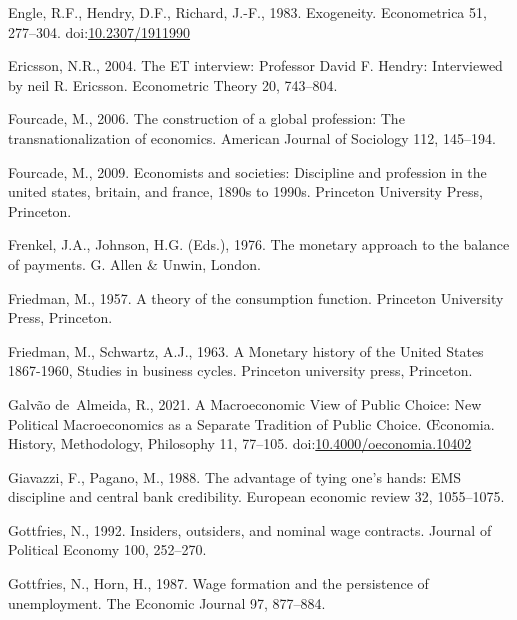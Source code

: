 \documentclass[
  12pt,
  onecolumn]{article}
\newlength{\cslhangindent}
\newlength{\cslentryspacingunit} %
\newenvironment{CSLReferences}[2] %
 {%
  \setlength{\parindent}{0pt}
  \ifodd #1
  \let\oldpar\par
  \def\par{\hangindent=\cslhangindent\oldpar}
  \fi
  \setlength{\parskip}{#2\cslentryspacingunit}
 }%
 {}
\begin{document}
\begin{CSLReferences}{1}{0}
\leavevmode{}%
Engle, R.F., Hendry, D.F., Richard, J.-F., 1983. Exogeneity. Econometrica 51, 277--304. doi:\href{https://doi.org/10.2307/1911990}{10.2307/1911990}

\leavevmode{}%
Ericsson, N.R., 2004. The {ET} interview: {Professor David F}. {Hendry}: {Interviewed} by neil {R}. {Ericsson}. Econometric Theory 20, 743--804.

\leavevmode{}%
Fourcade, M., 2006. The construction of a global profession: The transnationalization of economics. American Journal of Sociology 112, 145--194.

\leavevmode{}%
Fourcade, M., 2009. Economists and societies: Discipline and profession in the united states, britain, and france, 1890s to 1990s. Princeton University Press, Princeton.

\leavevmode{}%
Frenkel, J.A., Johnson, H.G. (Eds.), 1976. The monetary approach to the balance of payments. {G. Allen \& Unwin}, {London}.

\leavevmode{}%
Friedman, M., 1957. A theory of the consumption function. Princeton University Press, Princeton.

\leavevmode{}%
Friedman, M., Schwartz, A.J., 1963. A {Monetary} history of the {United} {States} 1867-1960, Studies in business cycles. Princeton university press, Princeton.

\leavevmode{}%
Galvão de~Almeida, R., 2021. A {Macroeconomic View} of {Public Choice}: {New Political Macroeconomics} as a {Separate Tradition} of {Public Choice}. Œconomia. History, Methodology, Philosophy 11, 77--105. doi:\href{https://doi.org/10.4000/oeconomia.10402}{10.4000/oeconomia.10402}

\leavevmode{}%
Giavazzi, F., Pagano, M., 1988. The advantage of tying one's hands: {EMS} discipline and central bank credibility. European economic review 32, 1055--1075.

\leavevmode{}%
Gottfries, N., 1992. Insiders, outsiders, and nominal wage contracts. Journal of Political Economy 100, 252--270.

\leavevmode{}%
Gottfries, N., Horn, H., 1987. Wage formation and the persistence of unemployment. The Economic Journal 97, 877--884.


\end{CSLReferences}
\end{document}
